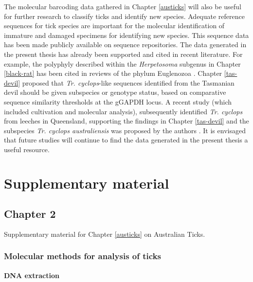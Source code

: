 \documentclass[a4paper, nobind]{templates/ociamthesis}
\begin{document}
The molecular barcoding data gathered in Chapter \ref{austicks} will also be useful for further research to classify ticks and identify new species. Adequate reference sequences for tick species are important for the molecular identification of immature and damaged specimens for identifying new species.
This sequence data has been made publicly available on sequence repositories.
The data generated in the present thesis has already been supported and cited in recent literature.
For example, the polyphyly described within the \emph{Herpetosoma} subgenus in Chapter \ref{black-rat} has been cited in reviews of the phylum Euglenozoa \autocite{kostygovEuglenozoaTaxonomyDiversity2021}.
Chapter \ref{tas-devil} proposed that \emph{Tr. cyclops}-like sequences identified from the Tasmanian devil should be given subspecies or genotype status, based on comparative sequence similarity thresholds at the gGAPDH locus.
A recent study (which included cultivation and molecular analysis), subsequently identified \emph{Tr. cyclops} from leeches in Queensland, supporting the findings in Chapter \ref{tas-devil} and the subspecies \emph{Tr. cyclops australiensis} was proposed by the authors \autocite{ellisNewSubspeciesTrypanosoma2021}.
It is envisaged that future studies will continue to find the data generated in the present thesis a useful resource.

\startappendices

\hypertarget{supplementary-material}{%
\chapter{Supplementary material}\label{supplementary-material}}

\hypertarget{ch2supp}{%
\section{Chapter 2}\label{ch2supp}}

Supplementary material for Chapter \ref{austicks} on Australian Ticks.

\hypertarget{molecular-methods-for-analysis-of-ticks}{%
\subsection{Molecular methods for analysis of ticks}\label{molecular-methods-for-analysis-of-ticks}}

\hypertarget{dna-extraction-1}{%
\subsubsection{DNA extraction}\label{dna-extraction-1}}
\end{document}

